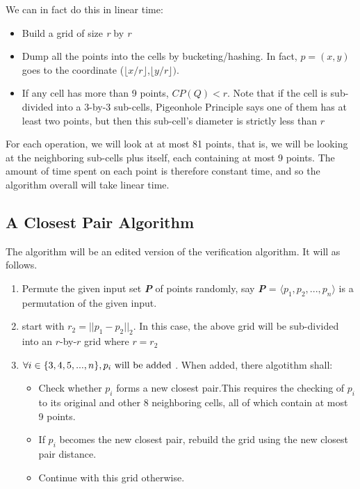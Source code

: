 \documentclass[12pt]{article}
\begin{document}
We can in fact do this in linear time:
\begin{itemize}
	\item Build a grid of size \textit{r} by \textit{r}
	\item Dump all the points into the cells by bucketing/hashing. In fact, $p = (x,y)$ goes to the coordinate ($\lfloor{x/r}\rfloor$,$\lfloor{y/r}\rfloor)$.
	\item If any cell has more than 9 points, $CP(Q) < r$. Note that if the cell is sub-divided into a 3-by-3 sub-cells, Pigeonhole Principle says one of them has at least two points, but then this sub-cell's diameter is strictly less than $r$
\end{itemize}
For each operation, we will look at at most 81 points, that is, we will be looking at the neighboring sub-cells plus itself, each containing at most 9 points. The amount of time spent on each point is therefore constant time, and so the algorithm overall will take linear time. 

\subsection{A Closest Pair Algorithm}
The algorithm will be an edited version of the verification algorithm. It will as follows.
\begin{enumerate}
	\item Permute the given input set \textbf{\textit{P}} of points randomly, say  \textbf{\textit{P}} =  $\langle p_{1},p_{2},...,p_{n}\rangle $ is a permutation of the given input.
	\item start with $r_{2} = || p_{1} - p_{2} ||_{2}$. In this case, the above grid will be sub-divided into an  $r$-by-$r$ grid where $r=r_{2}$
	\item $ \forall i \in \{3,4,5, ... , n\}, p_{i} \textmd{ will be added} $ . When added, there algotithm shall:
	\begin{itemize}
		\item Check whether $p_{i}$ forms a new closest pair.This requires the checking of $p_{i}$ to its original and other 8 neighboring cells, all of which contain at most 9 points. 
		\item If $p_{i}$ becomes the new closest pair, rebuild the grid using the new closest pair distance.
		\item Continue with this grid otherwise.
	\end{itemize}
\end{enumerate}
\end{document}
